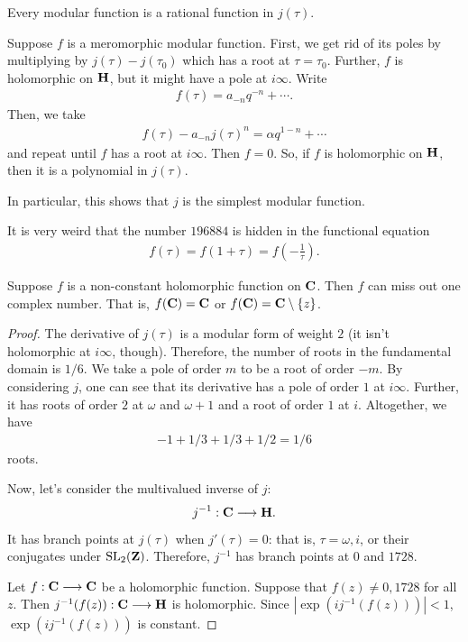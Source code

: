\documentclass[11pt, oneside,margin=1in]{article}
\begin{document}
\begin{proposition}[ ]\label{}\text{}
Every modular function is a rational function in $j(\tau)$.
\end{proposition}

Suppose $f$ is a meromorphic modular function. First, we get rid of its poles by multiplying by $j(\tau)- j (\tau_0)$ which has a root at $\tau=\tau_0$. Further, $f$ is holomorphic on $\mathbf H$, but it might have a pole at $i\infty$. Write 
\begin{align*}
	f(\tau) = a_{-n}q^{-n} +\cdots.
\end{align*}
Then, we take
\begin{align*}
	f(\tau) - a_{-n} j (\tau) ^n = \alpha q^{1-n} + \cdots
\end{align*}
and repeat until $f$ has a root at $i\infty$. Then $f=0$. So, if $f$ is holomorphic on $\mathbf H$, then it is a polynomial in $j(\tau)$. 

In particular, this shows that $j$ is the simplest modular function. 
\begin{remark}
	It is very weird that the number $196884$ is hidden in the functional equation
	\begin{align*}
		f(\tau) = f (1 + \tau) = f  \left( - \frac{1}{\tau} \right).
	\end{align*}
\end{remark}

\begin{theorem}[Picard]\label{}\index{}\text{}
Suppose $f$ is a non-constant holomorphic function on $\mathbf C$. Then $f$ can miss out one complex number. That is, $f(\mathbf C) = \mathbf C$ or $f(\mathbf C)= \mathbf C \setminus  \{z\}$.
\end{theorem}

\begin{proof}
The derivative of $j(\tau)$ is a modular form of weight $2$ (it isn't holomorphic at $i\infty$, though). Therefore, the number of roots in the fundamental domain is $1/6$. We take a pole of order $m$ to be a root of order $-m$. By considering $j$, one can see that its derivative has a pole of order $1$ at $i\infty$. Further, it has roots of order $2$ at $\omega$ and $\omega + 1$ and a root of order $1$ at $i$. Altogether, we have
\begin{align*}
	-1 + 1/3 + 1/3 + 1/2 = 1/6
\end{align*}
roots.

Now, let's consider the multivalued inverse of $j$:
\begin{align*}
	j^{-1} : \mathbf C \longrightarrow \mathbf H.
\end{align*}
It has branch points at $j(\tau)$ when $j'(\tau) = 0$: that is, $\tau = \omega,i$, or their conjugates under $\operatorname{SL}_{2}(\mathbf Z)$. Therefore, $j^{-1}$ has branch points at $0$ and $1728$. 

Let $f:\mathbf C\longrightarrow \mathbf C$ be a holomorphic function. Suppose that $f(z) \ne 0,1728$ for all $z$. Then $j^{-1}(f(z)):\mathbf C\longrightarrow \mathbf H$ is holomorphic. Since $\left\lvert \exp(ij^{-1}(f(z))) \right\rvert <1$, $\exp(i j^{-1}(f(z)))$ is constant.
\end{proof}
\end{document}
